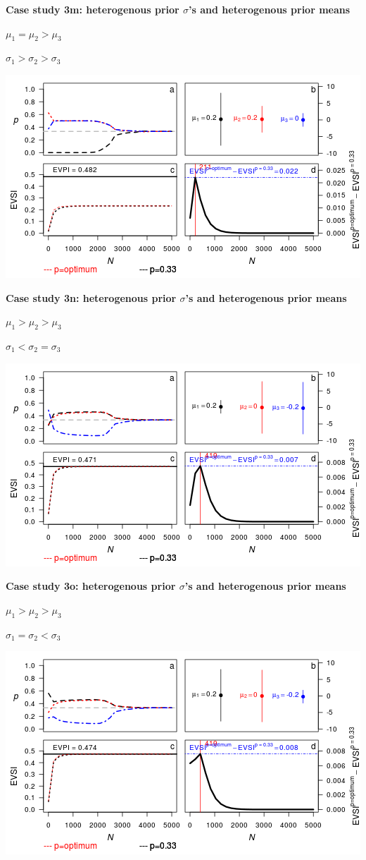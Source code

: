 \textbf{Case study 3m: heterogenous prior \(\sigma\)'s and heterogenous
prior means}

\(\mu_1 = \mu_2 > \mu_3\)

\(\sigma_1 > \sigma_2 > \sigma_3\)

\includegraphics{figure/x110___1__1_1c-1.png} \clearpage

\textbf{Case study 3n: heterogenous prior \(\sigma\)'s and heterogenous
prior means}

\(\mu_1 > \mu_2 > \mu_3\)

\(\sigma_1 < \sigma_2 = \sigma_3\)

\includegraphics{figure/x10n1_1__1__1c-1.png} \clearpage

\textbf{Case study 3o: heterogenous prior \(\sigma\)'s and heterogenous
prior means}

\(\mu_1 > \mu_2 > \mu_3\)

\(\sigma_1 = \sigma_2 < \sigma_3\)

\includegraphics{figure/x10n1__1__1_1c-1.png} \clearpage

